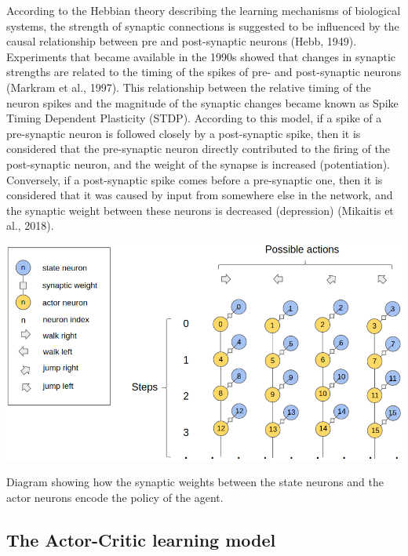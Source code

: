 \documentclass[10pt]{article}
\begin{document}
    According to the Hebbian theory describing the learning mechanisms of biological systems, the strength of synaptic connections is suggested to be influenced by the causal relationship between pre and post-synaptic neurons (Hebb, 1949). Experiments that became available in the 1990s showed that changes in synaptic strengths are related to the timing of the spikes of pre- and post-synaptic neurons (Markram et al., 1997). This relationship between the relative timing of the neuron spikes and the magnitude of the synaptic changes became known as Spike Timing Dependent Plasticity (STDP). According to this model, if a spike of a pre-synaptic neuron is followed closely by a post-synaptic spike, then it is considered that the pre-synaptic neuron directly contributed to the firing of the post-synaptic neuron, and the weight of the synapse is increased (potentiation). Conversely, if a post-synaptic spike comes before a pre-synaptic one, then it is considered that it was caused by input from somewhere else in the network, and the synaptic weight between these neurons is decreased (depression) (Mikaitis et al., 2018).

    \setcounter{suppfigure}{4}

    \begin{suppfigure*}
    \center
    \includegraphics[width=147mm]{./neuronsWideLegend.png}
    \caption{Diagram showing how the synaptic weights between the state neurons and the actor neurons encode the policy of the agent.}
    \label{fig:stateActor}
    \end{suppfigure*}

    \newpage

    \subsection{The Actor-Critic learning model}
\end{document}
